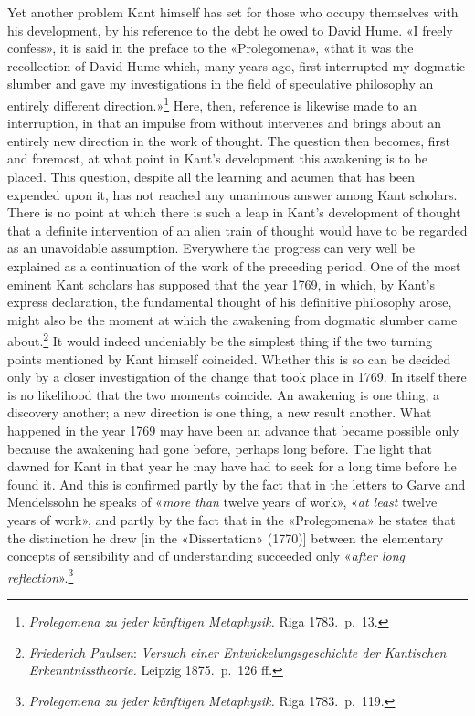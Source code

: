 \documentclass[12pt,a4paper]{article}
\newcommand{\opage}[1]{\marginnote{\footnotesize\textit{[#1]}}}
\begin{document}
Yet another problem Kant himself has set for those who occupy themselves
with his development, by his reference to the debt he owed to David Hume.
«I freely confess», it is said in the preface to the «Prolegomena», «that
it was the recollection of David Hume which, many years ago, first
interrupted my dogmatic slumber and gave my investigations in the field of
speculative philosophy an entirely different
direction.»\footnote{\textit{Prolegomena zu jeder künftigen Metaphysik.}
Riga 1783.\ p.\ 13.} Here, then, reference is likewise made to an
interruption, in that an impulse from without intervenes and brings about
an entirely new direction in \opage{7}the work of thought. The question then
becomes, first and foremost, at what point in Kant's development this
awakening is to be placed. This question, despite all the learning and
acumen that has been expended upon it, has not reached any unanimous
answer among Kant scholars. There is no point at which there is such a
leap in Kant's development of thought that a definite intervention of an
alien train of thought would have to be regarded as an unavoidable
assumption. Everywhere the progress can very well be explained as a
continuation of the work of the preceding period. One of the most eminent
Kant scholars has supposed that the year 1769, in which, by Kant's express
declaration, the fundamental thought of his definitive philosophy arose,
might also be the moment at which the awakening from dogmatic slumber came
about.\footnote{\emph{Friederich Paulsen}: \textit{Versuch einer
Entwickelungsgeschichte der Kantischen Erkenntnisstheorie.} Leipzig
1875.\ p.\ 126 ff.} It would indeed undeniably be the simplest thing if
the two turning points mentioned by Kant himself coincided. Whether this
is so can be decided only by a closer investigation of the change that
took place in 1769. In itself there is no likelihood that the two moments
coincide. An awakening is one thing, a discovery another; a new direction
is one thing, a new result another. What happened in the year 1769 may
have been an advance that became possible only because the awakening had
gone before, perhaps long before. The light that dawned for Kant in that
year he may have had to seek for a long time before he found it. And this
is confirmed partly by the fact that in the letters to Garve and
Mendelssohn he speaks of «\emph{more than} twelve years of work», «\emph{at least}
twelve years of work», and partly by the fact that in the «Prolegomena»
he states that the distinction he drew [in the «Dissertation» (1770)]
between the elementary concepts of sensibility and of understanding
succeeded only «\emph{after long reflection}».\footnote{\textit{Prolegomena zu
jeder künftigen Metaphysik.} Riga 1783.\ p.\ 119.}
\end{document}
